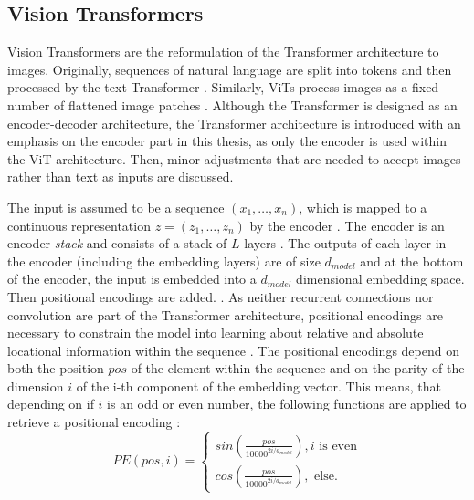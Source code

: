 \subsection{Vision Transformers}
\label{section: Vision Transformers}
Vision Transformers are the reformulation of the Transformer architecture \cite{Vaswani2017} to images.
Originally, sequences of natural language are split into tokens and then processed by the text Transformer \citep{Vaswani2017}.  
Similarly, ViTs process images as a fixed number of flattened image patches \citep{Dosovitskiy2020}.
Although the Transformer is designed as an encoder-decoder architecture, the Transformer architecture is introduced with an emphasis on the encoder part in this thesis, as only the encoder is used within the ViT architecture.
Then, minor adjustments that are needed to accept images rather than text as inputs are discussed.
\par
The input is assumed to be a sequence $(x_1,\dots,x_n)$, which is mapped to a continuous representation $z=(z_1,\dots,z_n)$ by the encoder \citep{Vaswani2017}.
The encoder is an encoder \textit{stack} and consists of a stack of $L$ layers \citep{Vaswani2017}.
The outputs of each layer in the encoder (including the embedding layers) are of size $d_{model}$ and at the bottom of the encoder, the input is embedded into a $d_{model}$ dimensional embedding space.
Then positional encodings are added. \citep{Vaswani2017}.
As neither recurrent connections nor convolution are part of the Transformer architecture, positional encodings are necessary to constrain the model into learning about relative and absolute locational information within the sequence \citep{Vaswani2017}.
The positional encodings depend on both the position $pos$ of the element within the sequence and on the parity of the dimension $i$ of the i-th component of the embedding vector.
This means, that depending on if $i$ is an odd or even number, the following functions are applied to retrieve a positional encoding \citep{Vaswani2017}:
\begin{equation}
	PE(pos, i) = 
	\begin{cases}
		sin(\frac{pos}{10000^{2i / d_{model}}}), i \text{ is even} \\
		cos(\frac{pos}{10000^{2i / d_{model}}}), \text{ else}.
	\end{cases}
	\label{equation:positional-encoding}
\end{equation}
